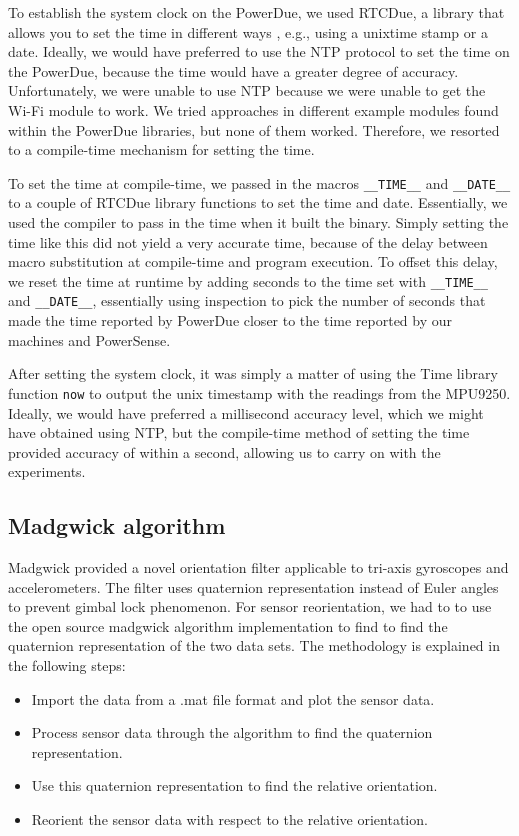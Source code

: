 \documentclass[journal]{IEEEtranTIE}
\begin{document}
To establish the system clock on the PowerDue, we used RTCDue, a library that
allows you to set the time in different ways \cite{RTCDue}, e.g., using a
unixtime stamp or a date. Ideally, we would have preferred to use the NTP
protocol to set the time on the PowerDue, because the time would have a greater
degree of accuracy. Unfortunately, we were unable to use NTP because we were
unable to get the Wi-Fi module to work. We tried approaches in different example
modules found within the PowerDue libraries, but none of them worked. Therefore,
we resorted to a compile-time mechanism for setting the time.

To set the time at compile-time, we passed in the macros \texttt{\_\_TIME\_\_}
and \texttt{\_\_DATE\_\_} to a couple of RTCDue library functions to set the
time and date. Essentially, we used the compiler to pass in the time when it
built the binary. Simply setting the time like this did not yield a very
accurate time, because of the delay between macro substitution at compile-time
and program execution. To offset this delay, we reset the time at runtime by
adding seconds to the time set with \texttt{\_\_TIME\_\_} and
\texttt{\_\_DATE\_\_}, essentially using inspection to pick the number of
seconds that made the time reported by PowerDue closer to the time reported by
our machines and PowerSense.

After setting the system clock, it was simply a matter of using the Time library
function \texttt{now} \cite{TimeLib} to output the unix timestamp with the
readings from the MPU9250. Ideally, we would have preferred a millisecond
accuracy level, which we might have obtained using NTP, but the compile-time
method of setting the time provided accuracy of within a second, allowing us to
carry on with the experiments.

\subsection{Madgwick algorithm}
Madgwick provided a novel orientation filter applicable to tri-axis gyroscopes and 
accelerometers. The filter uses quaternion representation instead of Euler angles 
to prevent gimbal lock phenomenon. For sensor reorientation, we had to to use the 
open source madgwick algorithm implementation to find to find the quaternion representation 
of the two data sets. The methodology is explained in the following steps:
\begin{itemize}
\item Import the data from a .mat file format and plot the sensor data.
\item Process sensor data through the algorithm to find the quaternion representation.
\item Use this quaternion representation to find the relative orientation.
\item Reorient the sensor data with respect to the relative orientation.
\end{itemize}
\end{document}
